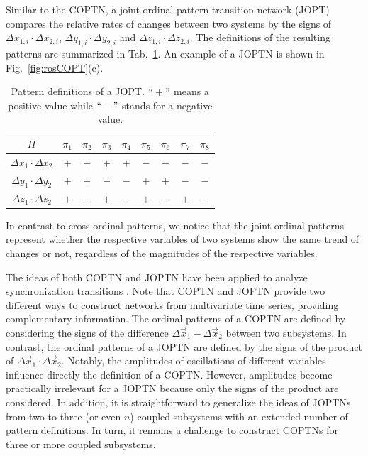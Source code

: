 Similar to the COPTN, a joint ordinal pattern transition network (JOPT) compares the relative rates of changes between two systems by the signs of $\Delta x_{1,i} \cdot \Delta x_{2,i}$, $\Delta y_{1,i} \cdot \Delta y_{2,i}$ and $\Delta z_{1,i} \cdot \Delta z_{2,i}$. The definitions of the resulting patterns are summarized in Tab.~\ref{tab:3DJOPT}. An example of a JOPTN is shown in Fig.~\ref{fig:rosCOPT}(c).
\begin{table}[htb]
\centering
\begin{tabular}{|c|c|c|c|c|c|c|c|c|}
\hline
$\Pi$      & $\pi_1$ & $\pi_2$ & $\pi_3$ & $\pi_4$ & $\pi_5$ & $\pi_6$ & $\pi_7$
& $\pi_8$\\
\hline
$\Delta x_1 \cdot \Delta x_2$ & $+ $ & $+ $ & $+$ & $+$ & $ - $ & $ - $ & $-$ & $ - $\\
\hline
$\Delta y_1 \cdot \Delta y_2$ & $ + $ & $ + $ & $ -$ & $ -$ & $ + $ & $ + $ & $ -$ & $ -$\\
\hline
$\Delta z_1 \cdot \Delta z_2$ & $ + $ & $ - $ & $ +$ & $ -$ & $ + $ & $ - $ & $+$ & $ -$\\
\hline
\end{tabular}
\caption{Pattern definitions of a JOPT. $``+"$ means a positive value while $``-"$ stands for a negative value.  \label{tab:3DJOPT}}
\end{table}
In contrast to cross ordinal patterns, we notice that the joint ordinal patterns represent whether the respective variables of two systems show the same trend of changes or not, regardless of the magnitudes of the respective variables.

The ideas of both COPTN and JOPTN have been applied to analyze synchronization transitions \cite{Guo2018}. Note that COPTN and JOPTN provide two different ways to construct networks from multivariate time series, providing complementary information. The ordinal patterns of a COPTN are defined by considering the signs of the difference $\Delta \vec{x}_1 - \Delta \vec{x}_2$ between two subsystems. In contrast, the ordinal patterns of a JOPTN are defined by the signs of the product of $\Delta \vec{x}_1 \cdot \Delta \vec{x}_2$. Notably, the amplitudes of oscillations of different variables influence directly the definition of a COPTN. However, amplitudes become practically irrelevant for a JOPTN because only the signs of the product are considered. In addition, it is straightforward to generalize the ideas of JOPTNs from two to three (or even $n$) coupled subsystems with an extended number of pattern definitions. In turn, it remains a challenge to construct COPTNs for three or more coupled subsystems. 


